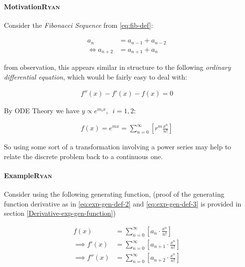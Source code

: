 \documentclass[a4paper,11pt,twoside]{article}
\begin{document}
\paragraph{Motivation\hfill{}\textsc{Ryan}}
\label{motivation}
Consider the \emph{Fibonacci Sequence} from \eqref{eq:fib-def}:


\begin{align}
    a_{n}&= a_{n - 1} + a_{n - 2} \nonumber \\
\iff a_{n+  2} &= a_{n+  1} +  a_n \label{eq:fib-def-shift}
\end{align}


from observation, this appears similar in structure to the following \emph{ordinary
differential equation}, which would be fairly easy to deal with:


\begin{align*}
f''\left( x \right)- f'\left( x \right)- f\left( x \right)=  0
\end{align*}

By ODE Theory we have \(y \propto e^{m_{i}x}, \enspace i = 1, 2\):

\begin{align*}
f\left( x \right)= e^{mx} = \sum^{\infty}_{n= 0}   \left[ r^{m} \frac{x^n}{n!} \right]
\end{align*}

So using some sort of a transformation involving a power series may help to
relate the discrete problem back to a continuous one.

\paragraph{Example\hfill{}\textsc{Ryan}}
\label{solving-the-sequence}
Consider using the following generating function, (proof of the
generating function derivative as in \eqref{eq:exp-gen-def-2} and \eqref{eq:exp-gen-def-3} is
provided in section \ref{Derivative-exp-gen-function})




\begin{align}
    f\left( x \right) &=  \sum^{\infty}_{n= 0}   \left[ a_{n} \cdot  \frac{x^n}{n!} \right]   \label{eq:exp-gen-def-1} \\
 \implies   f'\left( x \right) &=  \sum^{\infty}_{n= 0}   \left[ a_{n+1} \cdot  \frac{x^n}{n!} \right]   \label{eq:exp-gen-def-2} \\
\implies    f''\left( x \right) &=  \sum^{\infty}_{n= 0}   \left[ a_{n+2} \cdot  \frac{x^n}{n!} \right]   \label{eq:exp-gen-def-3}
\end{align}
\end{document}
